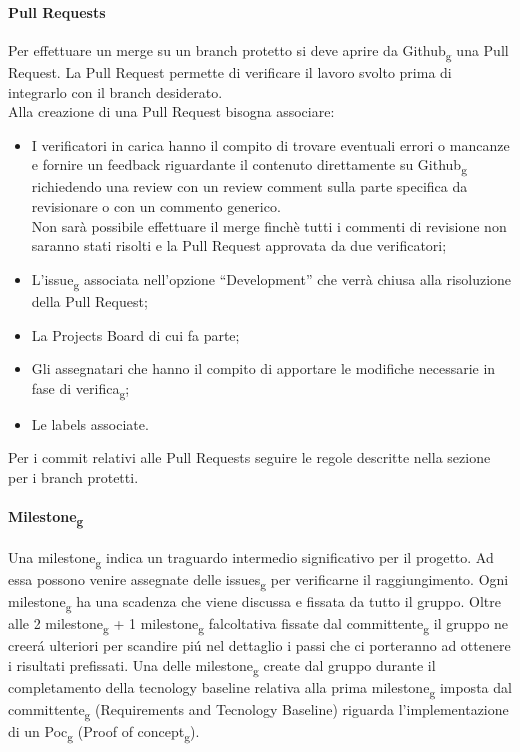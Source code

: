 \paragraph{Pull Requests}
\label{Pull_Requests}
Per effettuare un merge su un branch protetto si deve aprire da Github\textsubscript{g} una Pull Request.
La Pull Request permette di verificare il lavoro svolto prima di integrarlo con il branch desiderato.\\
Alla creazione di una Pull Request bisogna associare:
\begin{itemize}
\item I verificatori in carica hanno il compito di trovare eventuali errori o mancanze e fornire un feedback riguardante il contenuto direttamente su Github\textsubscript{g} richiedendo
una review con un review comment sulla parte specifica da revisionare o con un commento generico.\\
Non sarà possibile effettuare il merge finchè tutti i commenti di revisione non saranno stati risolti e la Pull Request approvata da due verificatori;
\item L’issue\textsubscript{g} associata nell’opzione “Development” che verrà chiusa alla risoluzione della Pull Request;
\item La Projects Board di cui fa parte;
\item Gli assegnatari che hanno il compito di apportare le modifiche necessarie in fase di verifica\textsubscript{g};
\item Le labels associate.
\end{itemize}
Per i commit relativi alle Pull Requests seguire le regole descritte nella sezione  per i branch protetti.

\paragraph{Milestone\textsubscript{g}}
Una milestone\textsubscript{g} indica un traguardo intermedio significativo per il progetto.
Ad essa possono venire assegnate delle issues\textsubscript{g} per verificarne il raggiungimento.
Ogni milestone\textsubscript{g} ha una scadenza che viene discussa e fissata da tutto il gruppo.
Oltre alle 2 milestone\textsubscript{g} + 1 milestone\textsubscript{g} falcoltativa fissate dal committente\textsubscript{g} il gruppo ne creerá ulteriori per scandire piú nel dettaglio i passi che ci porteranno 
ad ottenere i risultati prefissati.
Una delle milestone\textsubscript{g} create dal gruppo durante il completamento della tecnology baseline relativa alla prima milestone\textsubscript{g} imposta dal committente\textsubscript{g} (Requirements and Tecnology Baseline)
riguarda l'implementazione di un Poc\textsubscript{g} (Proof of concept\textsubscript{g}).

